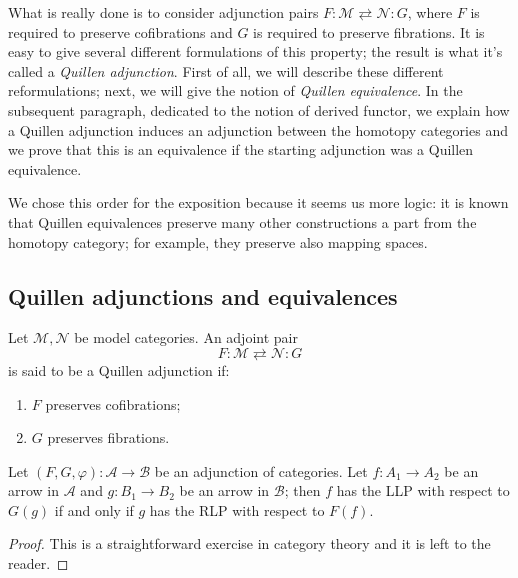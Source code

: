 \begin{refsection}
What is really done is to consider adjunction pairs $F \colon \mathcal M \rightleftarrows \mathcal N \colon G$, where $F$ is required to preserve cofibrations and $G$ is required to preserve fibrations. It is easy to give several different formulations of this property; the result is what it's called a \emph{Quillen adjunction}. First of all, we will describe these different reformulations; next, we will give the notion of \emph{Quillen equivalence}. In the subsequent paragraph, dedicated to the notion of derived functor, we explain how a Quillen adjunction induces an adjunction between the homotopy categories and we prove that this is an equivalence if the starting adjunction was a Quillen equivalence.

We chose this order for the exposition because it seems us more logic: it is known that Quillen equivalences preserve many other constructions a part from the homotopy category; for example, they preserve also mapping spaces.

\subsection{Quillen adjunctions and equivalences}

\begin{defin}
Let $\mathcal M, \mathcal N$ be model categories. An adjoint pair
\[
F \colon \mathcal M \rightleftarrows \mathcal N \colon G
\]
is said to be a Quillen adjunction if:
\begin{enumerate}
\item $F$ preserves cofibrations;
\item $G$ preserves fibrations.
\end{enumerate}
\end{defin}

\begin{lemma} \label{lemma adjunction and lifting properties}
Let $(F,G,\varphi) \colon \mathcal A \to \mathcal B$ be an adjunction of categories. Let $f \colon A_1 \to A_2$ be an arrow in $\mathcal A$ and $g \colon B_1 \to B_2$ be an arrow in $\mathcal B$; then $f$ has the LLP with respect to $G(g)$ if and only if $g$ has the RLP with respect to $F(f)$.
\end{lemma}

\begin{proof}
This is a straightforward exercise in category theory and it is left to the reader.
\end{proof}


\end{refsection}
